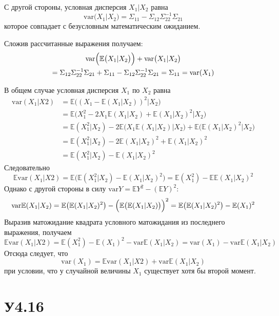 \documentclass[a4paper]{article}
\newcommand{\ex}[0]{{\mathbb{E}}}
\newcommand{\var}[0]{\text{var}}
\begin{document}
С другой стороны, условная дисперсия $X_1 \rvert X_2$ равна
\[\var\bigl( X_1 \rvert X_2 \bigr) = \Sigma_{11} - \Sigma_{12} \Sigma_{22}^{-1} \Sigma_{21}\]
которое совпадает с безусловным математическим ожиданием.

Сложив рассчитанные выражения получаем:
\begin{multline*}
\var\Bigl(\ex\bigl( X_1 \rvert X_2 \bigr)\Bigr) + \var\bigl( X_1 \rvert X_2 \bigr)\\
= \Sigma_{12} \Sigma_{22}^{-1} \Sigma_{21} + \Sigma_{11} - \Sigma_{12} \Sigma_{22}^{-1} \Sigma_{21}
= \Sigma_{11}
= \var(X_1)
\end{multline*}

В общем случае условная дисперсия $X_1$ по $X_2$ равна
\begin{align*}
	\var(X_1 \lvert X2)
	&= \ex\bigl( (X_1 - \ex(X_1 \lvert X_2))^2 \big\lvert X_2\bigr) \\
	&= \ex\bigl( X_1^2 - 2 X_1\ex(X_1 \lvert X_2) + \ex(X_1 \lvert X_2)^2 \big\lvert X_2\bigr) \\
	&= \ex( X_1^2 \lvert X_2) - 2 \ex\bigl( X_1 \ex(X_1 \lvert X_2) \big\lvert X_2\bigr) + \ex\bigl( \ex(X_1 \lvert X_2)^2 \big\lvert X_2\bigr) \\
	&= \ex( X_1^2 \lvert X_2) - 2 \ex(X_1 \lvert X_2)^2 + \ex(X_1 \lvert X_2)^2 \\
	&= \ex( X_1^2 \lvert X_2) - \ex(X_1 \lvert X_2)^2
\end{align*}
Следовательно
\[
\ex \var(X_1 \lvert X2)
= \ex\bigl( \ex( X_1^2 \lvert X_2) - \ex(X_1 \lvert X_2)^2 \bigr)
= \ex(X_1^2) - \ex \ex(X_1 \lvert X_2)^2
\]
Однако с другой стороны в силу $\var{Y} = \ex Y^2 - (\ex Y )^2$:
\[
\var \ex(X_1 \lvert X_2)
= \ex \bigl(\ex(X_1 \lvert X_2)^2\bigr) - \Bigl(\ex \bigl(\ex(X_1 \lvert X_2)\bigr)\Bigr)^2
= \ex \bigl(\ex(X_1 \lvert X_2)^2\bigr) - \ex(X_1)^2
\]
Выразив матожидание квадрата условного матожидания из последнего выражения, получаем
\[
\ex \var(X_1 \lvert X2)
= \ex(X_1^2) - \ex(X_1)^2 - \var \ex(X_1 \lvert X_2)
= \var(X_1) - \var \ex(X_1 \lvert X_2)
\]
Отсюда следует, что
\[\var(X_1) = \ex \var(X_1 \lvert X2) + \var \ex(X_1 \lvert X_2)\]
при условии, что у случайной величины $X_1$ существует хотя бы второй момент.


\section{У4.16} %
\label{sec:problem_4_16}
\end{document}
